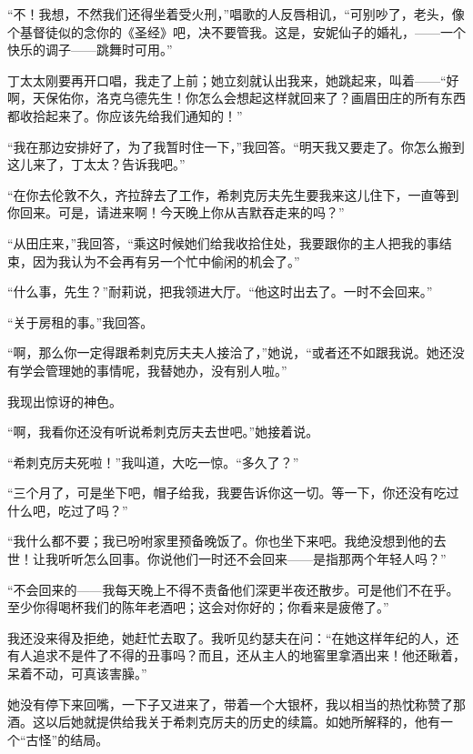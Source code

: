 \par “不！我想，不然我们还得坐着受火刑，”唱歌的人反唇相讥，“可别吵了，老头，像个基督徒似的念你的《圣经》吧，决不要管我。这是，安妮仙子的婚礼，——一个快乐的调子——跳舞时可用。”
\par 丁太太刚要再开口唱，我走了上前；她立刻就认出我来，她跳起来，叫着——“好啊，天保佑你，洛克乌德先生！你怎么会想起这样就回来了？画眉田庄的所有东西都收拾起来了。你应该先给我们通知的！”
\par “我在那边安排好了，为了我暂时住一下，”我回答。“明天我又要走了。你怎么搬到这儿来了，丁太太？告诉我吧。”
\par “在你去伦敦不久，齐拉辞去了工作，希刺克厉夫先生要我来这儿住下，一直等到你回来。可是，请进来啊！今天晚上你从吉默吞走来的吗？”
\par “从田庄来，”我回答，“乘这时候她们给我收拾住处，我要跟你的主人把我的事结束，因为我认为不会再有另一个忙中偷闲的机会了。”
\par “什么事，先生？”耐莉说，把我领进大厅。“他这时出去了。一时不会回来。”
\par “关于房租的事。”我回答。
\par “啊，那么你一定得跟希刺克厉夫夫人接洽了，”她说，“或者还不如跟我说。她还没有学会管理她的事情呢，我替她办，没有别人啦。”
\par 我现出惊讶的神色。
\par “啊，我看你还没有听说希刺克厉夫去世吧。”她接着说。
\par “希刺克厉夫死啦！”我叫道，大吃一惊。“多久了？”
\par “三个月了，可是坐下吧，帽子给我，我要告诉你这一切。等一下，你还没有吃过什么吧，吃过了吗？”
\par “我什么都不要；我已吩咐家里预备晚饭了。你也坐下来吧。我绝没想到他的去世！让我听听怎么回事。你说他们一时还不会回来——是指那两个年轻人吗？”
\par “不会回来的——我每天晚上不得不责备他们深更半夜还散步。可是他们不在乎。至少你得喝杯我们的陈年老酒吧；这会对你好的；你看来是疲倦了。”
\par 我还没来得及拒绝，她赶忙去取了。我听见约瑟夫在问：“在她这样年纪的人，还有人追求不是件了不得的丑事吗？而且，还从主人的地窖里拿酒出来！他还瞅着，呆着不动，可真该害臊。”
\par 她没有停下来回嘴，一下子又进来了，带着一个大银杯，我以相当的热忱称赞了那酒。这以后她就提供给我关于希刺克厉夫的历史的续篇。如她所解释的，他有一个“古怪”的结局。
